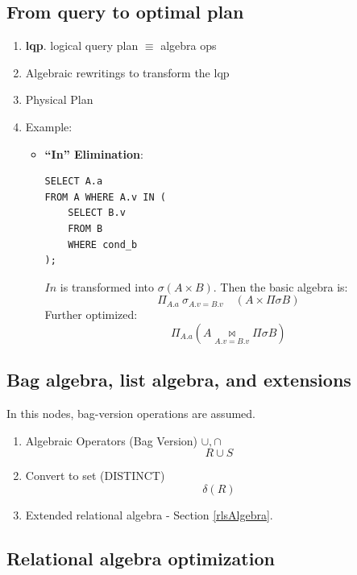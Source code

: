 \documentclass{article}
\begin{document}
\subsection{From query to optimal plan}
\begin{enumerate}
\item \textbf{lqp}. logical query plan $\equiv$ algebra ops 
\item Algebraic rewritings to transform the lqp
\item Physical Plan
\item Example:
\begin{itemize}
\item \textbf{``In'' Elimination}: 
\begin{lstlisting}
SELECT A.a
FROM A WHERE A.v IN (
    SELECT B.v
    FROM B
    WHERE cond_b
);
\end{lstlisting}
$In$ is transformed into $\sigma (A\times B)$. Then the basic algebra is:
$$
\Pi_{A.a}\ \sigma_{A.v=B.v}\quad (A \times \Pi \sigma B)
$$
Further optimized:
$$
\Pi_{A.a}(A \underset{A.v=B.v}\bowtie \Pi \sigma B)
$$

\end{itemize}
\end{enumerate}
\subsection{Bag algebra, list algebra, and extensions}
In this nodes, bag-version operations are assumed. 
\begin{enumerate}
\item Algebraic Operators (Bag Version) $\cup, \cap$
$$
R\cup S
$$
\item Convert to set (DISTINCT)
$$
\delta(R)
$$
\item Extended relational algebra - Section \ref{rlsAlgebra}.
\end{enumerate}
\subsection{Relational algebra optimization}
\end{document}
